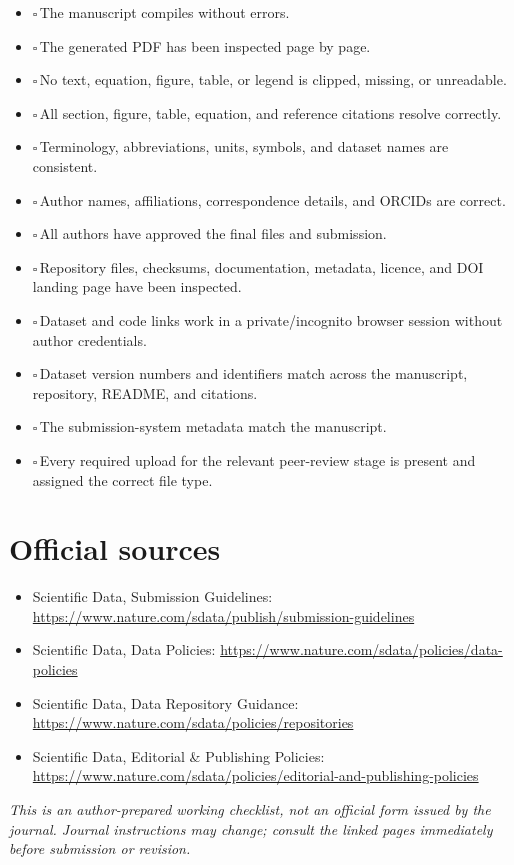 \documentclass[11pt]{article}
\newcommand{\cbox}{$\square$\,}
\begin{document}
\begin{itemize}
    \item \cbox The manuscript compiles without errors.
    \item \cbox The generated PDF has been inspected page by page.
    \item \cbox No text, equation, figure, table, or legend is clipped, missing, or unreadable.
    \item \cbox All section, figure, table, equation, and reference citations resolve correctly.
    \item \cbox Terminology, abbreviations, units, symbols, and dataset names are consistent.
    \item \cbox Author names, affiliations, correspondence details, and ORCIDs are correct.
    \item \cbox All authors have approved the final files and submission.
    \item \cbox Repository files, checksums, documentation, metadata, licence, and DOI landing page have been inspected.
    \item \cbox Dataset and code links work in a private/incognito browser session without author credentials.
    \item \cbox Dataset version numbers and identifiers match across the manuscript, repository, README, and citations.
    \item \cbox The submission-system metadata match the manuscript.
    \item \cbox Every required upload for the relevant peer-review stage is present and assigned the correct file type.
\end{itemize}

\section*{Official sources}

\begin{itemize}
    \item Scientific Data, Submission Guidelines: \url{https://www.nature.com/sdata/publish/submission-guidelines}
    \item Scientific Data, Data Policies: \url{https://www.nature.com/sdata/policies/data-policies}
    \item Scientific Data, Data Repository Guidance: \url{https://www.nature.com/sdata/policies/repositories}
    \item Scientific Data, Editorial \& Publishing Policies: \url{https://www.nature.com/sdata/policies/editorial-and-publishing-policies}
\end{itemize}

\vfill
\noindent\small\textit{This is an author-prepared working checklist, not an official form issued by the journal. Journal instructions may change; consult the linked pages immediately before submission or revision.}
\end{document}
